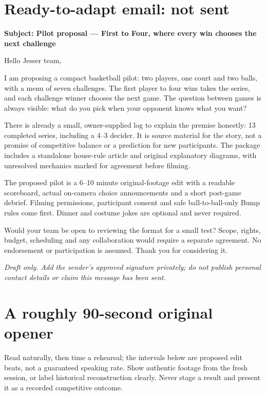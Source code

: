 \documentclass[11pt]{article}
\begin{document}
\section{Ready-to-adapt email: not sent}
\textbf{Subject: Pilot proposal --- First to Four, where every win chooses the next challenge}

Hello Jesser team,

I am proposing a compact basketball pilot: two players, one court and two balls,
with a menu of seven challenges. The first player to four wins takes the series,
and each challenge winner chooses the next game. The question between games is
always visible: what do you pick when your opponent knows what you want?

There is already a small, owner-supplied log to explain the premise honestly:
13 completed series, including a 4--3 decider. It is source material for the
story, not a promise of competitive balance or a prediction for new participants.
The package includes a standalone house-rule article and original explanatory
diagrams, with unresolved mechanics marked for agreement before filming.

The proposed pilot is a 6--10 minute original-footage edit with a readable
scoreboard, actual on-camera choice announcements and a short post-game debrief.
Filming permissions, participant consent and safe ball-to-ball-only Bump rules
come first. Dinner and costume jokes are optional and never required.

Would your team be open to reviewing the format for a small test? Scope, rights,
budget, scheduling and any collaboration would require a separate agreement.
No endorsement or participation is assumed. Thank you for considering it.

\textit{Draft only. Add the sender's approved signature privately; do not publish
personal contact details or claim this message has been sent.}

\section{A roughly 90-second original opener}
Read naturally, then time a rehearsal; the intervals below are proposed edit
beats, not a guaranteed speaking rate. Show authentic footage from the fresh
session, or label historical reconstruction clearly. Never stage a result and
present it as a recorded competitive outcome.
\end{document}
